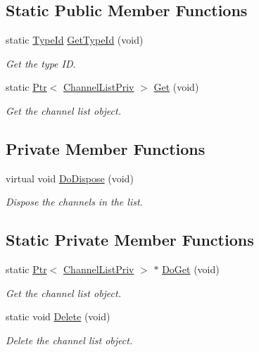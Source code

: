 \subsection*{Static Public Member Functions}
\begin{DoxyCompactItemize}
\item 
static \hyperlink{classns3_1_1TypeId}{Type\+Id} \hyperlink{classns3_1_1ChannelListPriv_a42b1bda3b827567b8ea5ba6498d277cd}{Get\+Type\+Id} (void)
\begin{DoxyCompactList}\small\item\em Get the type ID. \end{DoxyCompactList}\item 
static \hyperlink{classns3_1_1Ptr}{Ptr}$<$ \hyperlink{classns3_1_1ChannelListPriv}{Channel\+List\+Priv} $>$ \hyperlink{classns3_1_1ChannelListPriv_a4b98fc1ca31ce32a8dee4cc5937d856a}{Get} (void)
\begin{DoxyCompactList}\small\item\em Get the channel list object. \end{DoxyCompactList}\end{DoxyCompactItemize}
\subsection*{Private Member Functions}
\begin{DoxyCompactItemize}
\item 
virtual void \hyperlink{classns3_1_1ChannelListPriv_aaaf1acfbc6b8eb288dd07443a276fa16}{Do\+Dispose} (void)
\begin{DoxyCompactList}\small\item\em Dispose the channels in the list. \end{DoxyCompactList}\end{DoxyCompactItemize}
\subsection*{Static Private Member Functions}
\begin{DoxyCompactItemize}
\item 
static \hyperlink{classns3_1_1Ptr}{Ptr}$<$ \hyperlink{classns3_1_1ChannelListPriv}{Channel\+List\+Priv} $>$ $\ast$ \hyperlink{classns3_1_1ChannelListPriv_a6d9402b5e600c291fd63d5c03122406e}{Do\+Get} (void)
\begin{DoxyCompactList}\small\item\em Get the channel list object. \end{DoxyCompactList}\item 
static void \hyperlink{classns3_1_1ChannelListPriv_abf75496312beaf8b6377298039ca4289}{Delete} (void)
\begin{DoxyCompactList}\small\item\em Delete the channel list object. \end{DoxyCompactList}\end{DoxyCompactItemize}
